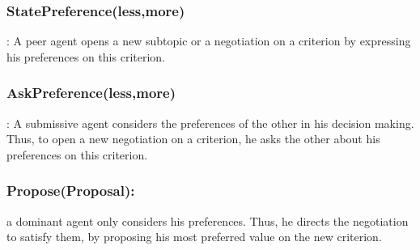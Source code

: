 \documentclass{llncs}
\begin{document}
 \subsubsection{StatePreference(less,more)}:  A peer agent opens a new subtopic or a negotiation on a criterion by expressing his preferences on this criterion.
 \subsubsection{AskPreference(less,more)}:  A submissive agent considers the preferences of the other in his decision making. Thus, to open a new negotiation on a criterion, he asks the other about his preferences on this criterion.
 \subsubsection {Propose(Proposal):} a dominant agent only considers his preferences. Thus, he directs the negotiation to satisfy them, by proposing his most preferred value on the new criterion. 
\noindent 
\vskip 4pt


\end{document}
